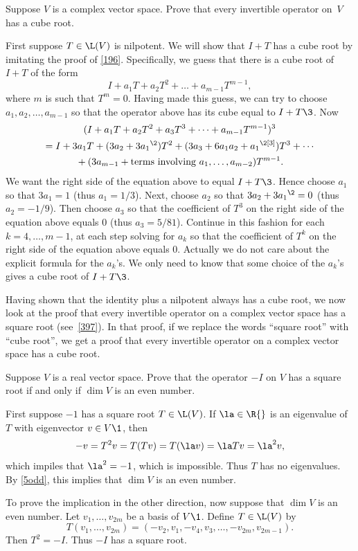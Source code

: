\exercise
Suppose $V$ is a complex vector space. Prove that every invertible operator
on~$V$ has a cube root.

\begin{Solution}
First suppose $T \in \L(V)$ is nilpotent.  We will show that $I + T$
has a cube root by imitating the proof of \ref{196}.  Specifically, we
guess that there is a cube root of $I + T$ of the form
\[
I + a_1 T + a_2 T^2 + \dots + a_{m-1} T^{m-1},
\]
where $m$ is such that $T^m = 0$.  Having made this guess, we can try to choose
$a_1, a_2, \dots, a_{m-1}$ so that  the
operator above has its cube equal to $I + T\3$.  Now
\begin{multline*}
(I + a_1 T + a_2 T^2 + a_3 T^3 + \dots + a_{m-1} T^{m-1})^3 \\
= I + 3a_1 T + (3a_2 + 3{a_1}^{\2}) T^2 +
(3a_3 + 6 a_1 a_2 + {a_1}^{\2[3]}) T^3 + \dotsb \\
{} + (3a_{m-1} + \text{terms involving $a_1, \dots, a_{m-2}$}) T^{m-1}.
\end{multline*}
We want the right side of the equation above to equal $I + T\3$.  Hence
choose $a_1$ so that $3a_1 = 1$ (thus $a_1 = 1/3$).  Next, choose $a_2$ so
that $3a_2 + 3{a_1}^{\2} = 0$ (thus $a_2 = -1/9$).  Then choose $a_3$ so that the
coefficient of $T^3$ on the right side of the equation above equals $0$ (thus
$a_3 = 5/81$).  Continue in this fashion for each $k = 4, \dots, m-1$, at each step
solving for $a_k$ so that the coefficient of $T^k$ on the right side of the
equation above equals $0$.  Actually we do not care about the explicit formula for
the $a_k$'s.  We only need to know that some choice of the $a_k$'s gives a cube
root of $I + T\3$.

Having shown that the identity plus a nilpotent always has a cube root, we now
look at the proof that every invertible operator on a complex vector space has a
square root (see~\ref{397}).  In that proof, if we replace the words ``square
root'' with ``cube root'', we get a proof that every invertible operator on
a complex vector space has a cube root.
\end{Solution}

\exercise
Suppose $V$ is a real vector space. Prove that the operator $-I$ on $V$ has a square root if and only if $\dim V$ is an even number.

\begin{Solution}
First suppose $-1$ has a square root $T \in \L(V)$. If $\la \in \R{}$ is an eigenvalue of $T$ with eigenvector $v \in V\1$, then
\[
-v = T^2 v = T(Tv) = T(\la v) = \la Tv = \la^2 v,
\]
which impiles that $\la^2 = -1$, which is impossible. Thus $T$ has no eigenvalues. By \ref{5odd}, this implies that $\dim V$ is an even number.

To prove the implication in the other direction, now suppose that $\dim V$ is an even number. Let $v_1, \ldots, v_{2m}$ be a basis of $V\1$. Define $T \in \L(V)$ by
\[
T(v_1, \ldots, v_{2m}) = (-v_2, v_1, -v_4, v_3, \ldots, -v_{2m}, v_{2m-1}).
\]
Then $T^2 = -I$. Thus $-I$ has a square root.
\end{Solution}

